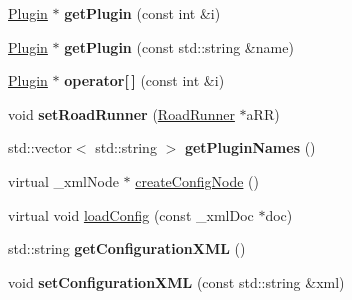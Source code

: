 \begin{DoxyCompactItemize}
\item 
\hypertarget{classrr_1_1_plugin_manager_adb9d2212590da4fa145f38b8cc6b60a5}{\hyperlink{classrr_1_1_plugin}{Plugin} $\ast$ {\bfseries get\-Plugin} (const int \&i)}\label{classrr_1_1_plugin_manager_adb9d2212590da4fa145f38b8cc6b60a5}

\item 
\hypertarget{classrr_1_1_plugin_manager_a3bb7462ec1ab3a0d8181e53cb8bb8aea}{\hyperlink{classrr_1_1_plugin}{Plugin} $\ast$ {\bfseries get\-Plugin} (const std\-::string \&name)}\label{classrr_1_1_plugin_manager_a3bb7462ec1ab3a0d8181e53cb8bb8aea}

\item 
\hypertarget{classrr_1_1_plugin_manager_ac710541dc16d677a3e81994144083b69}{\hyperlink{classrr_1_1_plugin}{Plugin} $\ast$ {\bfseries operator\mbox{[}$\,$\mbox{]}} (const int \&i)}\label{classrr_1_1_plugin_manager_ac710541dc16d677a3e81994144083b69}

\item 
\hypertarget{classrr_1_1_plugin_manager_a8680996af8f636a31e64ea5d5994b3b9}{void {\bfseries set\-Road\-Runner} (\hyperlink{classrr_1_1_road_runner}{Road\-Runner} $\ast$a\-R\-R)}\label{classrr_1_1_plugin_manager_a8680996af8f636a31e64ea5d5994b3b9}

\item 
\hypertarget{classrr_1_1_plugin_manager_ad16fee0c587ebfba7c4a983ce5247ece}{std\-::vector$<$ std\-::string $>$ {\bfseries get\-Plugin\-Names} ()}\label{classrr_1_1_plugin_manager_ad16fee0c587ebfba7c4a983ce5247ece}

\item 
virtual \-\_\-xml\-Node $\ast$ \hyperlink{classrr_1_1_plugin_manager_a754905e1f8d425f3b8c27bc05d410a75}{create\-Config\-Node} ()
\item 
virtual void \hyperlink{classrr_1_1_plugin_manager_aaaee1454d54fccf0554a98082cffebc9}{load\-Config} (const \-\_\-xml\-Doc $\ast$doc)
\item 
\hypertarget{classrr_1_1_plugin_manager_a42744ca74f6ad70256e6254f9ade023b}{std\-::string {\bfseries get\-Configuration\-X\-M\-L} ()}\label{classrr_1_1_plugin_manager_a42744ca74f6ad70256e6254f9ade023b}

\item 
\hypertarget{classrr_1_1_plugin_manager_a4416833cb838a1dd229ea36eb2277bba}{void {\bfseries set\-Configuration\-X\-M\-L} (const std\-::string \&xml)}\label{classrr_1_1_plugin_manager_a4416833cb838a1dd229ea36eb2277bba}

\end{DoxyCompactItemize}
